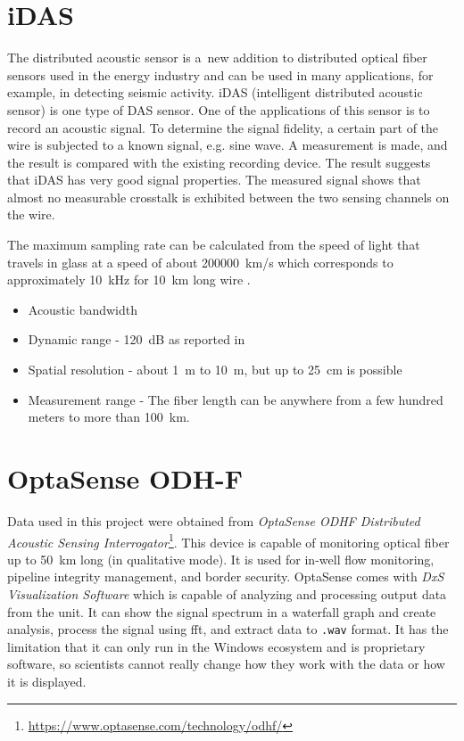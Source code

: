 
\section{iDAS}

The distributed acoustic sensor is a~new addition to distributed optical fiber sensors used in the energy industry and can be used in many applications, for example, in detecting seismic activity. iDAS (intelligent distributed acoustic sensor) is one type of DAS sensor. One of the applications of this sensor is to record an acoustic signal. To determine the signal fidelity, a certain part of the wire is subjected to a known signal, e.g. sine wave. A measurement is made, and the result is compared with the existing recording device. The result suggests that iDAS has very good signal properties. The measured signal shows that almost no measurable crosstalk is exhibited between the two sensing channels on the wire.

The maximum sampling rate can be calculated from the speed of light that travels in glass at a speed of about \qty{200000}{\km/\s} which corresponds to approximately \qty{10}{\kHz} for \qty{10}{\km} long wire \cite{WangYu2017RDVM}.


\begin{itemize}
    \item Acoustic bandwidth
    \item Dynamic range - \qty{120}{\dB} as reported in \cite{dasseismic}
    \item Spatial resolution - about \qty{1}{\m} to \qty{10}{\m}, but up to \qty{25}{\cm} is possible
    \item Measurement range - The fiber length can be anywhere from a few hundred meters to more than \qty{100}{\km}.
\end{itemize}



\section{OptaSense ODH-F}

Data used in this project were obtained from \textit{OptaSense ODHF Distributed Acoustic Sensing Interrogator}\footnote{\url{https://www.optasense.com/technology/odhf/}}. This device is capable of monitoring optical fiber up to \qty{50}{\km} long (in qualitative mode). It is used for in-well flow monitoring, pipeline integrity management, and border security. OptaSense comes with \textit{DxS Visualization Software} which is capable of analyzing and processing output data from the unit. It can show the signal spectrum in a waterfall graph and create analysis, process the signal using \ac{fft}, and extract data to \verb|.wav| format. It has the limitation that it can only run in the Windows ecosystem and is proprietary software, so scientists cannot really change how they work with the data or how it is displayed.


